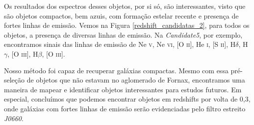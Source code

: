 Os resultados dos espectros desses objetos, por si só, são interessantes, visto que são objetos compactos, bem azuis, com formação estelar recente e presença de fortes linhas de emissão. Vemos na Figura \ref{redshift_candidatas_2}, para todos os objetos, a presença de diversas linhas de emissão. Na \textit{Candidate5}, por exemplo, encontramos sinais das linhas de emissão de Ne \textsc{v}, Ne \textsc{vi}, [O \textsc{ii}], He \textsc{i}, [S \textsc{ii}], H$\delta$, H$\gamma$, [O \textsc{iii}], H$\beta$, [O \textsc{iii}].

Nosso método foi capaz de recuperar galáxias compactas. Mesmo com essa pré-seleção de objetos que não estavam no aglomerado de Fornax, encontramos uma maneira de mapear e identificar objetos interessantes para estudos futuros. Em especial, concluímos que podemos encontrar objetos em redshifts por volta de 0,3, onde galáxias com fortes linhas de emissão serão evidenciadas pelo filtro estreito \textit{J0660}.

